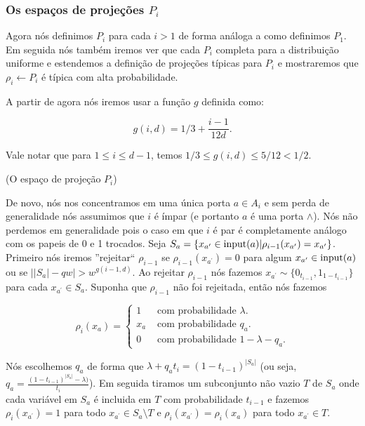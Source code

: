 \subsubsection{Os espaços de projeções $P_{i}$}

Agora nós definimos $P_{i}$ para cada $i > 1$ de forma análoga a como definimos $P_{1}$. Em seguida nós também iremos ver que cada $P_{i}$ completa para a distribuição uniforme e estendemos a definição de projeções típicas para $P_{i}$ e mostraremos que $\rho_{i} \leftarrow P_{i}$ é típica com alta probabilidade.

A partir de agora nós iremos usar a função $g$ definida como:

\begin{equation*}
    g(i, d) = 1/3 + \frac{i - 1}{12d}.
\end{equation*}

Vale notar que para $1 \leq i \leq d - 1$, temos $1/3 \leq g(i, d) \leq 5/12 < 1/2$.

\begin{defi} (O espaço de projeção $P_{i}$) \label{defi_Pi}

De novo, nós nos concentramos em uma única porta $a \in A_{i}$ e sem perda de generalidade nós assumimos que $i$ é ímpar (e portanto $a$ é uma porta $\land$). Nós não perdemos em generalidade pois o caso em que $i$ é par é completamente análogo com os papeis de 0 e 1 trocados. Seja $S_{a} = \{x_{a^{\prime}} \in \text{input}(a) \lvert \rho_{i - 1}(x_{a^{\prime}}) = x_{a^{\prime}}\}$. Primeiro nós iremos ''rejeitar`` $\rho_{i - 1}$ se $\rho_{i - 1}(x_{a^{\prime}}) = 0$ para algum $x_{a^{\prime}} \in \text{input}(a)$ ou se $\big\lvert \lvert S_{a} \rvert - qw \big\rvert > w^{g(i - 1, d)}$. Ao rejeitar $\rho_{i - 1}$ nós fazemos $x_{a^{\prime}} \sim \{0_{t_{i - 1}}, 1_{1 - t_{i - 1}}\}$ para cada $x_{a^{\prime}} \in S_{a}$. Suponha que $\rho_{i - 1}$ não foi rejeitada, então nós fazemos

\begin{equation*}
	\rho_{i}(x_{a}) = \begin{cases}
			        	  1 & \text{ com probabilidade } \lambda. \\
			        	  x_{a} & \text{ com probabilidade } q_{a}. \\
			        	  0 & \text{ com probabilidade } 1 - \lambda - q_{a}.
			        \end{cases}
\end{equation*}

Nós escolhemos $q_{a}$ de forma que $\lambda + q_{a}t_{i} = (1 -t_{i - 1})^{\lvert S_{a} \rvert}$ (ou seja, $q_{a} = \frac{(1 - t_{i - 1})^{\lvert S_{a} \rvert} - \lambda)}{t_{i}}$). Em seguida tiramos um subconjunto não vazio $T$ de $S_{a}$ onde cada variável em $S_{a}$ é incluida em $T$ com probabilidade $t_{i - 1}$ e fazemos $\rho_{i}(x_{a^{\prime}}) = 1$ para todo $x_{a^{\prime}} \in S_{a} \setminus T$ e $\rho_{i}(x_{a^{\prime}}) = \rho_{i}(x_{a})$ para todo $x_{a^{\prime}} \in T$.

\end{defi}

